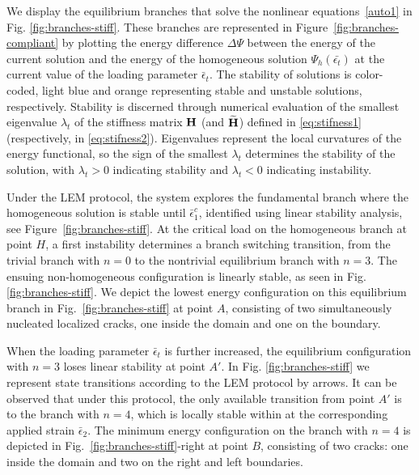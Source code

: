 We display the equilibrium branches that solve the nonlinear equations~\ref{auto1} in Fig. \ref{fig:branches-stiff}. These branches are represented in Figure~\ref{fig:branches-compliant} by plotting the energy difference $\Delta \Psi$ between the energy of the current solution and the energy of the homogeneous solution $\Psi_h(\bar{\epsilon_t})$ at the current value of the loading parameter $\bar\epsilon_t$. The stability of solutions is color-coded, light blue and orange representing stable and unstable solutions, respectively. Stability is discerned through numerical evaluation of the smallest eigenvalue $\lambda_t$ of the stiffness matrix $\mathbf{H}$ (and $\widetilde{\mathbf{H}}$) defined in \eqref{eq:stifness1} (respectively, in \eqref{eq:stifness2}). Eigenvalues represent the local curvatures of the energy functional, so the sign of the smallest  $\lambda_t$ determines the stability of the solution, with $\lambda_t > 0$ indicating stability and $\lambda_t < 0$ indicating instability.


Under the LEM protocol, the system explores the fundamental branch where the homogeneous solution is stable until 
$\bar\epsilon^c_1$, identified using linear stability analysis, see Figure~\ref{fig:branches-stiff}. At the critical load on the homogeneous branch  at point $H$, a first instability determines a branch switching transition, from the trivial branch with $n = 0$ to the nontrivial equilibrium branch with $n = 3$. The ensuing non-homogeneous configuration is linearly stable, as seen in Fig. \ref{fig:branches-stiff}. We depict the lowest energy configuration on this equilibrium branch in Fig.~\ref{fig:branches-stiff} at point $A$, consisting of two simultaneously nucleated localized cracks, one inside the domain and one on the boundary. 

When the loading parameter $\bar{\epsilon}_t$ is further increased, the equilibrium configuration with $n=3$ loses linear stability at point $A'$. In Fig. \ref{fig:branches-stiff} we represent state transitions according to the LEM protocol by arrows. It can be observed that under this protocol, the only available transition from point $A'$ is to the branch with $n=4$, which is locally stable within at the corresponding applied strain $\bar{\epsilon}_2$. The minimum energy configuration on the branch with $n=4$ is depicted in Fig.~\ref{fig:branches-stiff}-right at point $B$, consisting of two cracks: one inside the domain and two on the right and left boundaries.


